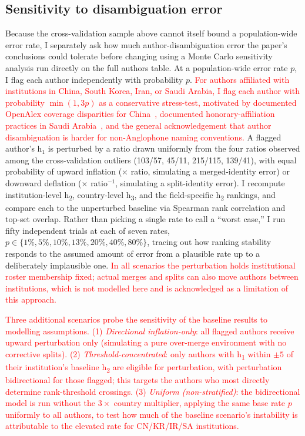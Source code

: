 \subsection{Sensitivity to disambiguation error}
\label{subsec:methods-sensitivity}
Because the cross-validation sample above cannot itself bound a population-wide error rate, I separately ask how much author-disambiguation error the paper's conclusions could tolerate before changing using a Monte Carlo sensitivity analysis run directly on the full authors table. At a population-wide error rate $p$, I flag each author independently with probability $p$. \textcolor{red}{For authors affiliated with institutions in China, South Korea, Iran, or Saudi Arabia, I flag each author with probability $\min(1, 3p)$ as a conservative stress-test, motivated by documented OpenAlex coverage disparities for China~\citep{zheng2025}, documented honorary-affiliation practices in Saudi Arabia~\citep{saudi}, and the general acknowledgement that author disambiguation is harder for non-Anglophone naming conventions.} A flagged author's $\mathrm{h}_1$ is perturbed by a ratio drawn uniformly from the four ratios observed among the cross-validation outliers (103/57, 45/11, 215/115, 139/41), with equal probability of upward inflation ($\times$ ratio, simulating a merged-identity error) or downward deflation ($\times$ ratio$^{-1}$, simulating a split-identity error).
I recompute institution-level h\textsubscript{2}, country-level h\textsubscript{3}, and the field-specific h\textsubscript{2} rankings, and compare each to the unperturbed baseline via Spearman rank correlation and top-set overlap. Rather than picking a single rate to call a ``worst case,'' I run fifty independent trials at each of seven rates, $p \in \{1\%, 5\%, 10\%, 13\%, 20\%, 40\%, 80\%\}$, tracing out how ranking stability responds to the assumed amount of error from a plausible rate up to a deliberately implausible one. \textcolor{red}{In all scenarios the perturbation holds institutional roster membership fixed; actual merges and splits can also move authors between institutions, which is not modelled here and is acknowledged as a limitation of this approach.}

\textcolor{red}{Three additional scenarios probe the sensitivity of the baseline results to modelling assumptions. (1) \emph{Directional inflation-only}: all flagged authors receive upward perturbation only (simulating a pure over-merge environment with no corrective splits). (2) \emph{Threshold-concentrated}: only authors with h\textsubscript{1} within $\pm 5$ of their institution's baseline h\textsubscript{2} are eligible for perturbation, with perturbation bidirectional for those flagged; this targets the authors who most directly determine rank-threshold crossings. (3) \emph{Uniform (non-stratified)}: the bidirectional model is run without the $3\times$ country multiplier, applying the same base rate $p$ uniformly to all authors, to test how much of the baseline scenario's instability is attributable to the elevated rate for CN/KR/IR/SA institutions.}

